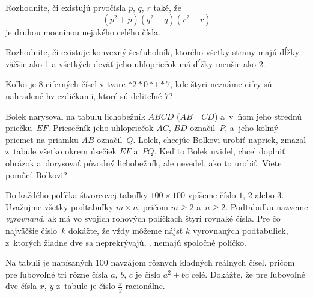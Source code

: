 {%
Rozhodnite, či existujú prvočísla $p$, $q$, $r$ také, že
$$(p^2+p)(q^2+q)(r^2+r)$$
je druhou mocninou nejakého celého čísla.}

{%
Rozhodnite, či existuje konvexný šesťuholník, ktorého všetky strany majú dĺžky väčšie ako 1 a všetkých deväť jeho uhlopriečok má dĺžky menšie ako 2.}

{%
Koľko je 8-ciferných čísel v tvare ${*}2{*}0{*}1{*}7$, kde štyri neznáme cifry sú nahradené hviezdičkami, ktoré sú deliteľné $7$?}

{%
Bolek narysoval na tabuľu lichobežník $ABCD$ ($AB\parallel CD$) a~v~ňom jeho strednú priečku~$EF$. Priesečník jeho uhlopriečok $AC$, $BD$ označil~$P$, a~jeho kolmý priemet na priamku $AB$ označil~$Q$. Lolek, chcejúc Bolkovi urobiť napriek, zmazal z~tabule všetko okrem úsečiek $EF$ a~$PQ$. Keď to Bolek uvidel, chcel doplniť obrázok a~dorysovať pôvodný lichobežník, ale nevedel, ako to urobiť. Viete pomôcť Bolkovi?}

{%
Do každého políčka štvorcovej tabuľky $100\times 100$ vpíšeme číslo $1$, $2$ alebo $3$. Uvažujme všetky podtabuľky $m\times n$, pričom $m\ge 2$ a~$n\ge 2$. Podtabuľku nazveme {\it vyrovnaná}, ak má vo svojich rohových políčkach štyri rovnaké čísla. Pre čo najväčšie číslo~$k$ dokážte, že vždy môžeme nájsť $k$ vyrovnaných podtabuliek, z~ktorých žiadne dve sa neprekrývajú, \tj. nemajú spoločné políčko.}

{%
Na tabuli je napísaných 100 navzájom rôznych kladných reálnych čísel, pričom pre ľubovoľné tri rôzne čísla $a$, $b$, $c$ je číslo $a^2+bc$ celé. Dokážte, že pre ľubovoľné dve čísla $x$, $y$ z~tabule je číslo $\frac xy$ racionálne.}
